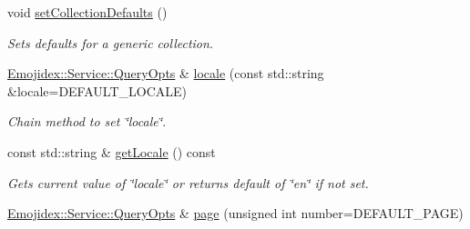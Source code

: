 \begin{DoxyCompactItemize}
\item 
void \hyperlink{classEmojidex_1_1Service_1_1QueryOpts_a8644a708f05f9cc96d2a58021c2c58ad}{set\+Collection\+Defaults} ()\hypertarget{classEmojidex_1_1Service_1_1QueryOpts_a8644a708f05f9cc96d2a58021c2c58ad}{}\label{classEmojidex_1_1Service_1_1QueryOpts_a8644a708f05f9cc96d2a58021c2c58ad}

\begin{DoxyCompactList}\small\item\em Sets defaults for a generic collection. \end{DoxyCompactList}\item 
\hyperlink{classEmojidex_1_1Service_1_1QueryOpts}{Emojidex\+::\+Service\+::\+Query\+Opts} \& \hyperlink{classEmojidex_1_1Service_1_1QueryOpts_aaf1f11b06b53a16a21a664225b16ddd6}{locale} (const std\+::string \&locale=D\+E\+F\+A\+U\+L\+T\+\_\+\+L\+O\+C\+A\+LE)\hypertarget{classEmojidex_1_1Service_1_1QueryOpts_aaf1f11b06b53a16a21a664225b16ddd6}{}\label{classEmojidex_1_1Service_1_1QueryOpts_aaf1f11b06b53a16a21a664225b16ddd6}

\begin{DoxyCompactList}\small\item\em Chain method to set \char`\"{}locale\char`\"{}. \end{DoxyCompactList}\item 
const std\+::string \& \hyperlink{classEmojidex_1_1Service_1_1QueryOpts_a21ac7ce8f5aabc514b9febb5ef98c7a1}{get\+Locale} () const 
\begin{DoxyCompactList}\small\item\em Gets current value of \char`\"{}locale\char`\"{} or returns default of \char`\"{}en\char`\"{} if not set. \end{DoxyCompactList}\item 
\hyperlink{classEmojidex_1_1Service_1_1QueryOpts}{Emojidex\+::\+Service\+::\+Query\+Opts} \& \hyperlink{classEmojidex_1_1Service_1_1QueryOpts_a09de9071d7d678fc2cbfd3b625261b22}{page} (unsigned int number=D\+E\+F\+A\+U\+L\+T\+\_\+\+P\+A\+GE)\hypertarget{classEmojidex_1_1Service_1_1QueryOpts_a09de9071d7d678fc2cbfd3b625261b22}{}\label{classEmojidex_1_1Service_1_1QueryOpts_a09de9071d7d678fc2cbfd3b625261b22}


\end{DoxyCompactItemize}
